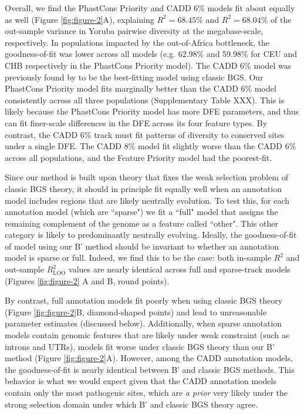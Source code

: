 \documentclass[11pt]{article}
\begin{document}
Overall, we find the PhastCons Priority and CADD 6\% models fit about equally
as well (Figure \ref{fig:figure-2}A), explaining $R^2=68.45$\% and
$R^2=68.04$\% of the out-sample variance in Yoruba pairwise diversity at the
megabase-scale, respectively. In populations impacted by the out-of-Africa
bottleneck, the goodness-of-fit was lower across all models (e.g. 62.98\% and
59.98\% for CEU and CHB respectively in the PhastCons Priority model). The CADD
6\% model was previously found by \textcite{Murphy2022-sj} to be the
best-fitting model using classic BGS. Our PhastCons Priority model fits
marginally better than the CADD 6\% model consistently across all three
populations (Supplementary Table XXX). This is likely because the PhastCons
Priority model has more DFE parameters, and thus can fit finer-scale
differences in the DFE across its four feature types. By contrast, the CADD 6\%
track must fit patterns of diversity to conserved sites under a single DFE. The
CADD 8\% model fit slightly worse than the CADD 6\% across all populations, and
the Feature Priority model had the poorest-fit.

Since our method is built upon theory that fixes the weak selection problem of
classic BGS theory, it should in principle fit equally well when an annotation
model includes regions that are likely neutrally evolution. To test this, for
each annotation model (which are ``sparse") we fit a ``full" model that assigns
the remaining complement of the genome as a feature called ``other". This other
category is likely to predominantly neutrally evolving. Ideally, the
goodness-of-fit of model using our B' method should be invariant to whether an
annotation model is sparse or full. Indeed, we find this to be the case: both
in-sample $R^2$ and out-sample $R_\text{LOO}^2$ values are nearly identical
across full and sparse-track models (Figures \ref{fig:figure-2} A and B, round
points). 

By contrast, full annotation models fit poorly when using classic BGS theory
(Figure \ref{fig:figure-2}B, diamond-shaped points) and lead to unreasonable
parameter estimates (discussed below). Additionally, when sparse annotation
models contain genomic features that are likely under weak constraint (such as
introns and UTRs), models fit worse under classic BGS theory than our B' method
(Figure \ref{fig:figure-2}A). However, among the CADD annotation models, the
goodness-of-fit is nearly identical between B' and classic BGS methods. This
behavior is what we would expect given that the CADD annotation models contain
only the most pathogenic sites, which are \emph{a prior} very likely under the
strong selection domain under which B' and classic BGS theory agree.
\end{document}
